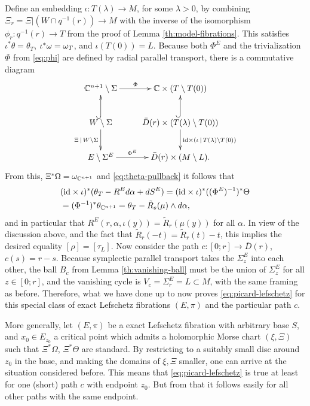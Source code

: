 \documentclass[10pt,letterpaper]{article}
\begin{document}
Define an embedding $\iota: T(\lambda) \rightarrow M$, for some $\lambda>0$, by
combining $\Xi_r = \Xi|(W \cap q^{-1}(r)) \rightarrow M$ with the inverse of
the isomorphism $\phi_r: q^{-1}(r) \rightarrow T$ from the proof of Lemma
\ref{th:model-fibrations}. This satisfies $\iota^*\theta = \theta_T$,
$\iota^*\omega = \omega_T$, and $\iota(T(0)) = L$. Because both $\Phi^E$ and the
trivialization $\Phi$ from \eqref{eq:phi} are defined by radial parallel
transport, there is a commutative diagram
\[
\xymatrix{
 {\C^{n+1} \setminus \Sigma} \ar[r]^-{\Phi} &
 {\C \times (T \setminus T(0))} \\
 {W \setminus \Sigma} \ar@{^{(}->}[u] \ar[d]_{\Xi\,|\,W \setminus \Sigma} &
 {\bar{D}(r) \times (T(\lambda) \setminus T(0))} \ar@{^{(}->}[u]
 \ar[d]^{\id \times (\iota \,|\, T(\lambda) \setminus T(0))} \\
 {E \setminus \Sigma^E} \ar[r]^-{\Phi^E} & {\bar{D}(r) \times (M \setminus L).}
}
\]
From this, $\Xi^*\Omega = \omega_{\mathbb{C}^{n+1}}$ and \eqref{eq:theta-pullback} it
follows that
\begin{align*}
 & (\mathrm{id} \times \iota)^*(\theta_T - R^E d\alpha + dS^E)
 = (\mathrm{id} \times \iota)^*((\Phi^E)^{-1})^*\Theta \\
 & = (\Phi^{-1})^*\theta_{\mathbb{C}^{n+1}} = \theta_T - \tilde{R}_s(\mu) \wedge d\alpha,
\end{align*}
and in particular that $R^E(r,\alpha,\iota(y)) = \tilde{R}_r(\mu(y))$ for all
$\alpha$. In view of the discussion above, and the fact that $\tilde{R}_r(-t) =
\tilde{R}_r(t) - t$, this implies the desired equality $[\rho] = [\tau_L]$. Now
consider the path $c: [0;r] \rightarrow \bar{D}(r)$, $c(s) = r-s$. Because
symplectic parallel transport takes the $\Sigma^E_z$ into each other, the ball
$B_c$ from Lemma \ref{th:vanishing-ball} must be the union of $\Sigma^E_z$ for
all $z \in [0;r]$, and the vanishing cycle is $V_c = \Sigma^E_r = L \subset M$,
with the same framing as before. Therefore, what we have done up to now proves
\eqref{eq:picard-lefschetz} for this special class of exact Lefschetz
fibrations $(E,\pi)$ and the particular path $c$.

More generally, let $(E,\pi)$ be a exact Lefschetz fibration with arbitrary
base $S$, and $x_0 \in E_{z_0}$ a critical point which admits a holomorphic
Morse chart $(\xi,\Xi)$ such that $\Xi^*\Omega$, $\Xi^*\Theta$ are standard. By
restricting to a suitably small disc around $z_0$ in the base, and making the
domains of $\xi,\Xi$ smaller, one can arrive at the situation considered
before. This means that \eqref{eq:picard-lefschetz} is true at least for one
(short) path $c$ with endpoint $z_0$. But from that it follows easily for all
other paths with the same endpoint.
\end{document}
